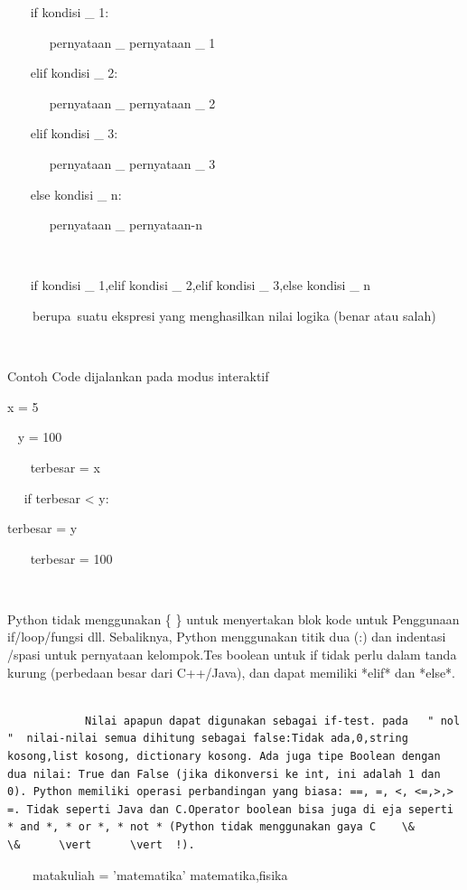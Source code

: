  
~~~ if kondisi   \_  1: 

 
~~~~~~ pernyataan   \_  pernyataan   \_  1 

 
~~~ elif kondisi   \_  2: 

 
~~~~~~ pernyataan   \_  pernyataan   \_  2 

 
~~~ elif kondisi   \_  3: 

 
~~~~~~ pernyataan   \_  pernyataan   \_  3 

 
~~~ else kondisi   \_  n: 

 
~~~~~~ pernyataan   \_  pernyataan-n 

 
~~~~~~  
 
~~~ if kondisi   \_  1,elif kondisi   \_  2,elif kondisi   \_  3,else kondisi   \_  n 

 
~~~~berupa~suatu ekspresi yang menghasilkan nilai logika (benar atau salah)    
 
~~~  
 
Contoh Code dijalankan pada modus interaktif 

 
  x = 5 

 
~ y = 100 

 
~~~ terbesar = x 

 
~~ if terbesar < y: 

 
terbesar = y 

~~~ terbesar = 100  

 
~~~  

 
   Python tidak menggunakan    \{     \}   untuk menyertakan blok kode untuk Penggunaan if/loop/fungsi dll. Sebaliknya, Python menggunakan titik dua (:) dan indentasi /spasi untuk pernyataan   kelompok.Tes   boolean untuk if tidak perlu dalam tanda kurung (perbedaan besar dari C++/Java), dan dapat memiliki *elif* dan *else*. 
 
\begin{verbatim}

            Nilai apapun dapat digunakan sebagai if-test. pada   " nol  "  nilai-nilai semua dihitung sebagai false:Tidak ada,0,string kosong,list kosong, dictionary kosong. Ada juga tipe Boolean dengan dua nilai: True dan False (jika dikonversi ke int, ini adalah 1 dan 0). Python memiliki operasi perbandingan yang biasa: ==, =, <, <=,>,> =. Tidak seperti Java dan C.Operator boolean bisa juga di eja seperti * and *, * or *, * not * (Python tidak menggunakan gaya C    \&      \&      \vert      \vert  !). 
\end{verbatim}
 
~~~~matakuliah = 'matematika'   matematika,fisika 
 
